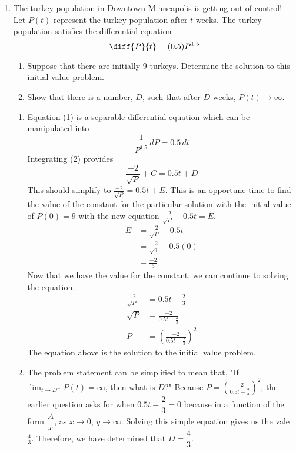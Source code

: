 \documentclass{article}
\begin{document}
\begin{enumerate}[label=\textbf{(2.\arabic*)}]

\item The turkey population in Downtown Minneapolis is getting out of control! Let $P(t)$ represent the turkey population after $t$ weeks. The turkey population satisfies the differential equation
\begin{equation}
\diff{P}{t} = (0.5)P^{1.5}
\end{equation}
\begin{enumerate}
\item Suppose that there are initially 9 turkeys. Determine the solution to this initial value problem.
\item Show that there is a number, $D$, such that after $ D$ weeks,
$P(t)\rightarrow\infty$.
\end{enumerate}

\begin{enumerate}
\item Equation (1) is a separable differential equation which can be manipulated into
\begin{equation}
\frac{1}{P^{1.5}}\,dP=0.5\,dt
\end{equation}
Integrating (2) provides 
\begin{equation}
\frac{-2}{\sqrt{P}}+C=0.5t+D
\end{equation}
This should simplify to $\displaystyle \frac{-2}{\sqrt{P}}=0.5t+E$. This is an opportune time to find the value of the constant for the particular solution with the initial value of $P(0)=9$ with the new equation $\displaystyle \frac{-2}{\sqrt{P}}-0.5t=E$.
\begin{align*}
E &=\frac{-2}{\sqrt{P}}-0.5t\\
  &=\frac{-2}{\sqrt{9}}-0.5(0)\\
  &= \frac{-2}{3}
\end{align*}
Now that we have the value for the constant, we can continue to solving the equation.
\begin{align*}
\frac{-2}{\sqrt{P}}&=0.5t-\frac{2}{3}\\
\sqrt{P} &= \frac{-2}{0.5t-\frac{2}{3}}\\
P &= \left( \frac{-2}{0.5t-\frac{2}{3}}\right)^2
\end{align*}
The equation above is the solution to the initial value problem.
\item The problem statement can be simplified to mean that, "If $\displaystyle \lim_{t\to D^-} P(t) = \infty$, then what is $D$?" Because $P = \left( \frac{-2}{0.5t-\frac{2}{3}}\right)^2$, the earlier question asks for when $0.5t-\dfrac{2}{3}=0$ because in a function of the form $\dfrac{A}{x}$, as $x\to0$, $y\to\infty$. Solving this simple equation gives us the vale $\frac{4}{3}$. Therefore, we have determined that $D=\dfrac{4}{3}$.
\end{enumerate}


\end{enumerate}
\end{document}
